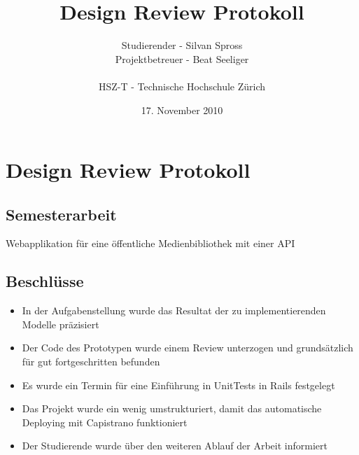 \documentclass[]{scrreprt}
\title{Design Review Protokoll}
\author{Studierender - Silvan Spross\\
    Projektbetreuer - Beat Seeliger\\
    \\
    HSZ-T - Technische Hochschule Zürich}
\date{17. November 2010}
\begin{document}
    \ifpdf
    \else
    \fi

    \maketitle



    \chapter{Design Review Protokoll}

    \section{Semesterarbeit}
    Webapplikation für eine öffentliche Medienbibliothek mit einer 
    API

    \section{Beschlüsse}
    \begin{itemize}
        \item In der Aufgabenstellung wurde das Resultat der zu 
            implementierenden Modelle präzisiert
        \item Der Code des Prototypen wurde einem Review unterzogen und
            grundsätzlich für gut fortgeschritten befunden
        \item Es wurde ein Termin für eine Einführung in UnitTests in Rails
            festgelegt
        \item Das Projekt wurde ein wenig umstrukturiert, damit das
            automatische Deploying mit Capistrano funktioniert
        \item Der Studierende wurde über den weiteren Ablauf der 
            Arbeit informiert
    \end{itemize}
    
\end{document}
